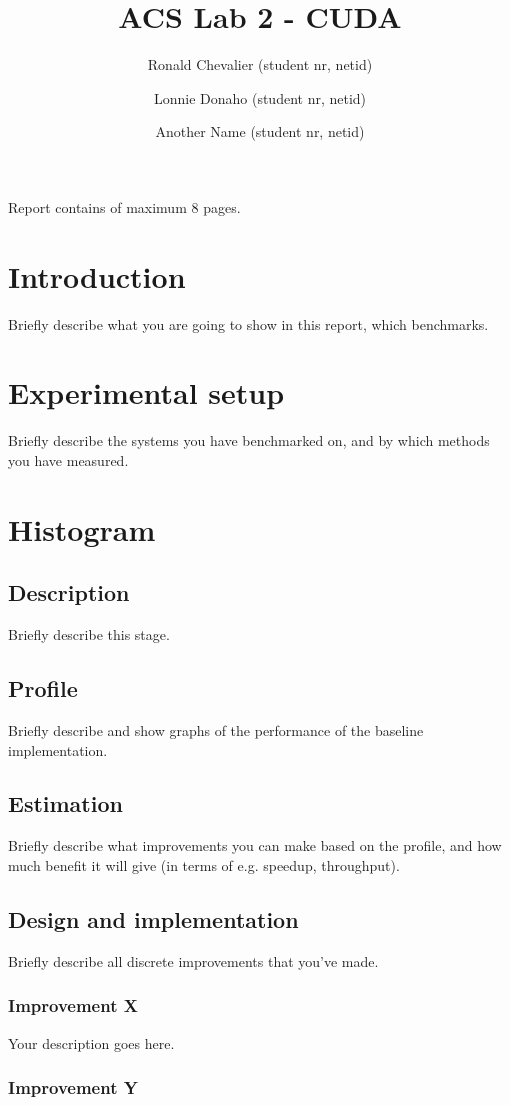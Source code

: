 \documentclass[twocolumn]{article}
\title{\large{\textbf{ACS Lab 2 - CUDA}}}
\author{
    \small Ronald Chevalier (student nr, netid)
    \and \small Lonnie Donaho (student nr, netid)
    \and \small Another Name (student nr, netid)
}
\date{}
\begin{document}
\maketitle

\begin{center}
    \footnotesize{Report contains \pageref{LastPage} of maximum 8 pages.}
\end{center}

\section{Introduction}
Briefly describe what you are going to show in this report, which benchmarks.

\section{Experimental setup}
Briefly describe the systems you have benchmarked on, and by which methods you have measured.

\section{Histogram}
\subsection{Description}
Briefly describe this stage.
\subsection{Profile}
Briefly describe and show graphs of the performance of the baseline implementation.
\subsection{Estimation}
Briefly describe what improvements you can make based on the profile, and how much benefit it will give (in terms of e.g. speedup, throughput).
\subsection{Design and implementation}
Briefly describe all discrete improvements that you've made.
\subsubsection{Improvement X}
Your description goes here.
\subsubsection{Improvement Y}
\end{document}
